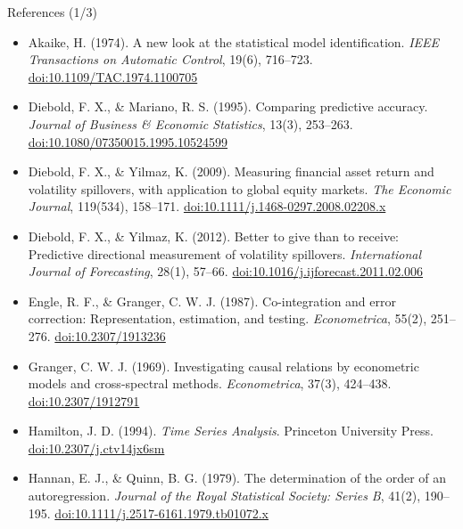 \begin{frame}{References (1/3)}
\itemsize{\scriptsize}
\begin{itemize}
    \item Akaike, H. (1974). A new look at the statistical model identification. \textit{IEEE Transactions on Automatic Control}, 19(6), 716--723. \href{https://doi.org/10.1109/TAC.1974.1100705}{doi:10.1109/TAC.1974.1100705}
    \item Diebold, F. X., \& Mariano, R. S. (1995). Comparing predictive accuracy. \textit{Journal of Business \& Economic Statistics}, 13(3), 253--263. \href{https://doi.org/10.1080/07350015.1995.10524599}{doi:10.1080/07350015.1995.10524599}
    \item Diebold, F. X., \& Yilmaz, K. (2009). Measuring financial asset return and volatility spillovers, with application to global equity markets. \textit{The Economic Journal}, 119(534), 158--171. \href{https://doi.org/10.1111/j.1468-0297.2008.02208.x}{doi:10.1111/j.1468-0297.2008.02208.x}
    \item Diebold, F. X., \& Yilmaz, K. (2012). Better to give than to receive: Predictive directional measurement of volatility spillovers. \textit{International Journal of Forecasting}, 28(1), 57--66. \href{https://doi.org/10.1016/j.ijforecast.2011.02.006}{doi:10.1016/j.ijforecast.2011.02.006}
    \item Engle, R. F., \& Granger, C. W. J. (1987). Co-integration and error correction: Representation, estimation, and testing. \textit{Econometrica}, 55(2), 251--276. \href{https://doi.org/10.2307/1913236}{doi:10.2307/1913236}
    \item Granger, C. W. J. (1969). Investigating causal relations by econometric models and cross-spectral methods. \textit{Econometrica}, 37(3), 424--438. \href{https://doi.org/10.2307/1912791}{doi:10.2307/1912791}
    \item Hamilton, J. D. (1994). \textit{Time Series Analysis}. Princeton University Press. \href{https://doi.org/10.2307/j.ctv14jx6sm}{doi:10.2307/j.ctv14jx6sm}
    \item Hannan, E. J., \& Quinn, B. G. (1979). The determination of the order of an autoregression. \textit{Journal of the Royal Statistical Society: Series B}, 41(2), 190--195. \href{https://doi.org/10.1111/j.2517-6161.1979.tb01072.x}{doi:10.1111/j.2517-6161.1979.tb01072.x}
\end{itemize}
\end{frame}

